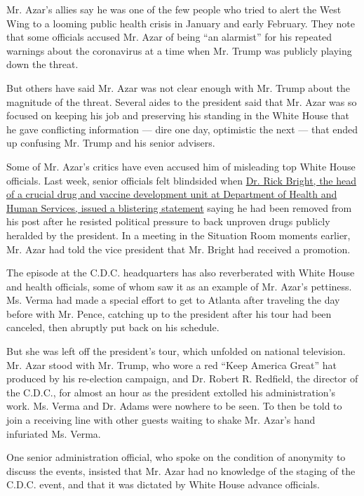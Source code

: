 Mr. Azar's allies say he was one of the few people who tried to alert
the West Wing to a looming public health crisis in January and early
February. They note that some officials accused Mr. Azar of being ``an
alarmist'' for his repeated warnings about the coronavirus at a time
when Mr. Trump was publicly playing down the threat.

But others have said Mr. Azar was not clear enough with Mr. Trump about
the magnitude of the threat. Several aides to the president said that
Mr. Azar was so focused on keeping his job and preserving his standing
in the White House that he gave conflicting information --- dire one
day, optimistic the next --- that ended up confusing Mr. Trump and his
senior advisers.

Some of Mr. Azar's critics have even accused him of misleading top White
House officials. Last week, senior officials felt blindsided when
\href{https://www.nytimes.com/2020/04/22/us/politics/rick-bright-trump-hydroxychloroquine-coronavirus.html}{Dr.
Rick Bright, the head of a crucial drug and vaccine development unit at
Department of Health and Human Services, issued a blistering statement}
saying he had been removed from his post after he resisted political
pressure to back unproven drugs publicly heralded by the president. In a
meeting in the Situation Room moments earlier, Mr. Azar had told the
vice president that Mr. Bright had received a promotion.

The episode at the C.D.C. headquarters has also reverberated with White
House and health officials, some of whom saw it as an example of Mr.
Azar's pettiness. Ms. Verma had made a special effort to get to Atlanta
after traveling the day before with Mr. Pence, catching up to the
president after his tour had been canceled, then abruptly put back on
his schedule.

But she was left off the president's tour, which unfolded on national
television. Mr. Azar stood with Mr. Trump, who wore a red ``Keep America
Great'' hat produced by his re-election campaign, and Dr. Robert R.
Redfield, the director of the C.D.C., for almost an hour as the
president extolled his administration's work. Ms. Verma and Dr. Adams
were nowhere to be seen. To then be told to join a receiving line with
other guests waiting to shake Mr. Azar's hand infuriated Ms. Verma.

One senior administration official, who spoke on the condition of
anonymity to discuss the events, insisted that Mr. Azar had no knowledge
of the staging of the C.D.C. event, and that it was dictated by White
House advance officials.

